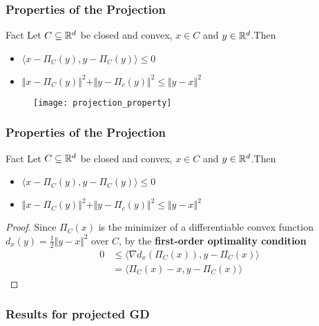 \documentclass{beamer}
\begin{document}
\begin{frame}
  \frametitle{Properties of the Projection}
  \begin{block}{Fact}
    Let $C\subseteq \mathbb{R}^d$ be closed and convex, $x\in C$ and $y \in \mathbb{R}^d$.Then
    \begin{itemize}
      \item $\langle x- \Pi_C(y), y - \Pi_C(y)  \rangle \le 0$
      \item $\Vert x - \Pi_C(y) \Vert^2 + \Vert y - \Pi_c(y) \Vert^2 \le \Vert y-x \Vert^2$
    \end{itemize}
  \end{block}
  \begin{figure}[ht]
    \centering
    \texttt{[image: projection\_property]}
  \end{figure}

\end{frame}


\begin{frame}
  \frametitle{Properties of the Projection}
  \begin{block}{Fact}
    Let $C\subseteq \mathbb{R}^d$ be closed and convex, $x\in C$ and $y \in \mathbb{R}^d$.Then
    \begin{itemize}
      \item $\langle x- \Pi_C(y), y - \Pi_C(y)  \rangle \le 0$
      \item $\Vert x - \Pi_C(y) \Vert^2 + \Vert y - \Pi_c(y) \Vert^2 \le \Vert y-x \Vert^2$
    \end{itemize}
  \end{block}
  \begin{proof}
    Since $\Pi_C(x)$ is the minimizer of a differentiable convex function $d_x(y) =\frac12 \Vert y-x \Vert^2$ over $C$, by the \textbf{first-order optimality condition}
    \begin{align}
      0 &\le \langle \nabla d_x(\Pi_C(x)), y - \Pi_C(x) \rangle \\
        &= \langle \Pi_C(x) - x, y - \Pi_C(x) \rangle
    \end{align}
  \end{proof}
\end{frame}



\begin{frame}
  \frametitle{Results for projected GD}

\end{frame}
\end{document}
